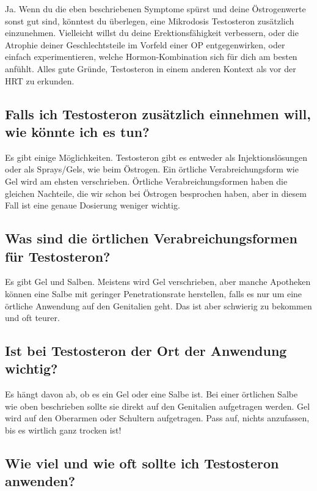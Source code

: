 \documentclass{article}
\begin{document}
Ja. Wenn du die eben beschriebenen Symptome spürst und deine Östrogenwerte sonst gut sind, könntest du überlegen, eine Mikrodosis Testosteron zusätzlich einzunehmen. Vielleicht willst du deine Erektionsfähigkeit verbessern, oder die Atrophie deiner Geschlechtsteile im Vorfeld einer OP entgegenwirken, oder einfach experimentieren, welche Hormon-Kombination sich für dich am besten anfühlt. Alles gute Gründe, Testosteron in einem anderen Kontext als vor der HRT zu erkunden.

\subsection{Falls ich Testosteron zusätzlich einnehmen will, wie könnte ich es tun?}

Es gibt einige Möglichkeiten. Testosteron gibt es entweder als Injektionslösungen oder als Sprays/Gels, wie beim Östrogen. Ein örtliche Verabreichungsform wie Gel wird am ehsten verschrieben. Örtliche Verabreichungsformen haben die gleichen Nachteile, die wir schon bei Östrogen besprochen haben, aber in diesem Fall ist eine genaue Dosierung weniger wichtig.

\subsection{Was sind die örtlichen Verabreichungsformen für Testosteron?}

Es gibt Gel und Salben. Meistens wird Gel verschrieben, aber manche Apotheken können eine Salbe mit geringer Penetrationsrate herstellen, falls es nur um eine örtliche Anwendung auf den Genitalien geht. Das ist aber schwierig zu bekommen und oft teurer.

\subsection{Ist bei Testosteron der Ort der Anwendung wichtig?}

Es hängt davon ab, ob es ein Gel oder eine Salbe ist. Bei einer örtlichen Salbe wie oben beschrieben sollte sie direkt auf den Genitalien aufgetragen werden. Gel wird auf den Oberarmen oder Schultern aufgetragen. Pass auf, nichts anzufassen, bis es wirtlich ganz trocken ist!

\subsection{Wie viel und wie oft sollte ich Testosteron anwenden?}
\end{document}
